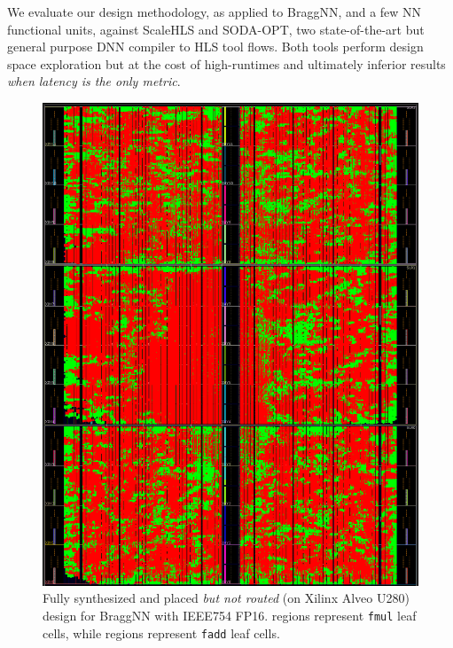 We evaluate our design methodology, as applied to BraggNN, and a few NN functional units, against ScaleHLS\cite{ye2021scalehls} and SODA-OPT\cite{9516615}, two state-of-the-art but general purpose DNN compiler to HLS tool flows.
Both tools perform design space exploration but at the cost of high-runtimes and ultimately inferior results \emph{when latency is the only metric}.


\begin{figure}
	\includegraphics[width=\columnwidth]{figures/fp16_placed}
	\caption{Fully synthesized and placed \emph{but not routed} (on Xilinx Alveo U280) design for BraggNN with IEEE754 FP16. \crule[red]{0.25cm}{0.25cm} regions represent \texttt{fmul} leaf cells, while \crule[green]{0.25cm}{0.25cm} regions represent \texttt{fadd} leaf cells.}\label{fig:placed_braggnn}
\end{figure}

